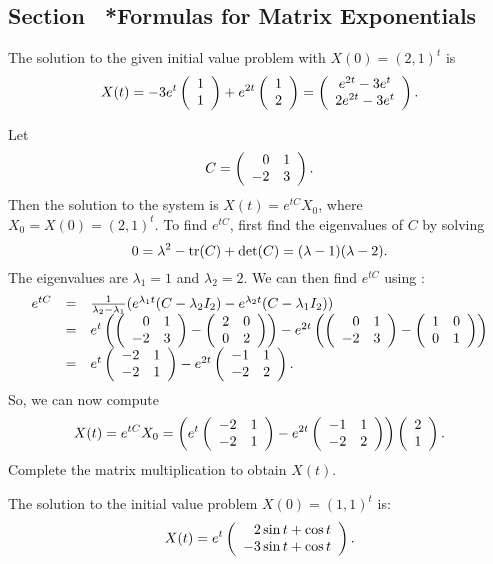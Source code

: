 \subsection*{Section~\protect{\ref{S:6.6}} *Formulas for Matrix Exponentials}

\ans The solution to the given initial value problem with $X(0) = (2,1)^t$
is
\[
X(t) = -3e^t\left(\begin{array}{r} 1 \\ 1\end{array}\right) + e^{2t}\left(\begin{array}{r} 1 \\ 2\end{array}\right)
= \left(\begin{array}{c} e^{2t} - 3e^t \\ 2e^{2t} - 3e^t\end{array}\right).
\]

\soln Let \[ C = \left(\begin{array}{rr} 0 & 1\\ -2 &3\end{array}\right). \]
Then the solution to the system is $X(t) = e^{tC}X_0$, where
$X_0 = X(0) = (2,1)^t$.
To find $e^{tC}$, first find the eigenvalues of $C$ by solving
\[
0 = \lambda^2 - {\rm tr}(C) + \det(C) = (\lambda - 1)(\lambda - 2).
\]
The eigenvalues are $\lambda_1 = 1$ and $\lambda_2 = 2$.  We can
then find $e^{tC}$ using :
\[
\begin{array}{rcl}
e^{tC} & = & \frac{1}{\lambda_2 - \lambda_1}(e^{\lambda_1 t}(C -
\lambda_2 I_2) - e^{\lambda_2 t}(C - \lambda_1 I_2)) \\
& = & e^t\left(\left(\begin{array}{rr} 0 & 1\\ -2 &3\end{array}\right) - \left(\begin{array}{rr} 2 & 0\\ 0 &2\end{array}\right)\right) -
e^{2t}\left(\left(\begin{array}{rr} 0 & 1\\ -2 &3\end{array}\right) - \left(\begin{array}{rr} 1 & 0\\ 0 &1\end{array}\right)\right) \\
& = &
e^t\left(\begin{array}{rr} -2 & 1\\ -2 &1\end{array}\right) - e^{2t}\left(\begin{array}{rr} -1 & 1\\ -2 &2\end{array}\right).
\end{array}
\]
So, we can now compute
\[
X(t) = e^{tC}X_0
= \left(e^t\left(\begin{array}{rr} -2 & 1\\ -2 &1\end{array}\right) -
e^{2t}\left(\begin{array}{rr} -1 & 1\\ -2 &2\end{array}\right)\right)\left(\begin{array}{r} 2 \\ 1\end{array}\right).
\]
Complete the matrix multiplication to obtain $X(t)$.

\ans The solution to the initial value problem $X(0) = (1,1)^t$ is:
\[
X(t) = e^t\left(\begin{array}{r} 2\sin{t} + \cos{t} \\ -3\sin{t} + \cos{t}\end{array}\right).
\]

